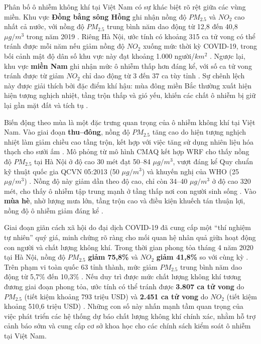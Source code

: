 Phân bố ô nhiễm không khí tại Việt Nam có sự khác biệt rõ rệt giữa các vùng miền. Khu vực \textbf{Đồng bằng sông Hồng} ghi nhận nồng độ $PM_{2.5}$ và $NO_2$ cao nhất cả nước, với nồng độ $PM_{2.5}$ trung bình năm dao động từ 12,8 đến 40,8 $\mu g/m^3$ trong năm 2019 \cite{hoang2023health}. Riêng Hà Nội, ước tính có khoảng 315 ca tử vong có thể tránh được mỗi năm nếu giảm nồng độ $NO_2$ xuống mức thời kỳ COVID-19, trong bối cảnh mật độ dân số khu vực này đạt khoảng 1.000 người/$km^2$ \cite{hoang2023health}. Ngược lại, khu vực \textbf{miền Nam} ghi nhận mức ô nhiễm thấp hơn đáng kể, với số ca tử vong tránh được từ giảm $NO_2$ chỉ dao động từ 3 đến 37 ca tùy tỉnh \cite{hoang2023health}. Sự chênh lệch này được giải thích bởi đặc điểm khí hậu: mùa đông miền Bắc thường xuất hiện hiện tượng nghịch nhiệt, tầng trộn thấp và gió yếu, khiến các chất ô nhiễm bị giữ lại gần mặt đất và tích tụ \cite{dam2024pm25, ho2025assessment}.

Biến động theo mùa là một đặc trưng quan trọng của ô nhiễm không khí tại Việt Nam. Vào giai đoạn \textbf{thu--đông}, nồng độ $PM_{2.5}$ tăng cao do hiện tượng nghịch nhiệt làm giảm chiều cao tầng trộn, kết hợp với việc tăng sử dụng nhiên liệu hóa thạch cho sưởi ấm \cite{dam2024pm25, ho2025assessment}. Mô phỏng từ mô hình CMAQ kết hợp WRF cho thấy nồng độ $PM_{2.5}$ tại Hà Nội ở độ cao 30 mét đạt 50--84 $\mu g/m^3$, vượt đáng kể Quy chuẩn kỹ thuật quốc gia QCVN 05:2013 (50 $\mu g/m^3$) và khuyến nghị của WHO (25 $\mu g/m^3$) \cite{nguyen2024cmaq}. Nồng độ này giảm dần theo độ cao, chỉ còn 34--40 $\mu g/m^3$ ở độ cao 320 mét, cho thấy ô nhiễm tập trung mạnh ở tầng thấp nơi con người sinh sống \cite{dam2024pm25}. Vào \textbf{mùa hè}, nhờ lượng mưa lớn, tầng trộn cao và điều kiện khuếch tán thuận lợi, nồng độ ô nhiễm giảm đáng kể \cite{dam2024pm25}.

Giai đoạn giãn cách xã hội do đại dịch COVID-19 đã cung cấp một ``thí nghiệm tự nhiên'' quý giá, minh chứng rõ ràng cho mối quan hệ nhân quả giữa hoạt động con người và chất lượng không khí. Trong thời gian phong tỏa tháng 4 năm 2020 tại Hà Nội, nồng độ $PM_{2.5}$ \textbf{giảm 75,8\%} và $NO_2$ \textbf{giảm 41,8\%} so với cùng kỳ \cite{hoang2023health}. Trên phạm vi toàn quốc 63 tỉnh thành, mức giảm $PM_{2.5}$ trung bình năm dao động từ 5,7\% đến 10,3\% \cite{hoang2023health}. Nếu duy trì được mức chất lượng không khí tương đương giai đoạn phong tỏa, ước tính có thể tránh được \textbf{3.807 ca tử vong} do $PM_{2.5}$ (tiết kiệm khoảng 793 triệu USD) và \textbf{2.451 ca tử vong} do $NO_2$ (tiết kiệm khoảng 510,6 triệu USD) \cite{hoang2023health}. Những con số này nhấn mạnh tầm quan trọng của việc phát triển các hệ thống dự báo chất lượng không khí chính xác, nhằm hỗ trợ cảnh báo sớm và cung cấp cơ sở khoa học cho các chính sách kiểm soát ô nhiễm tại Việt Nam.

